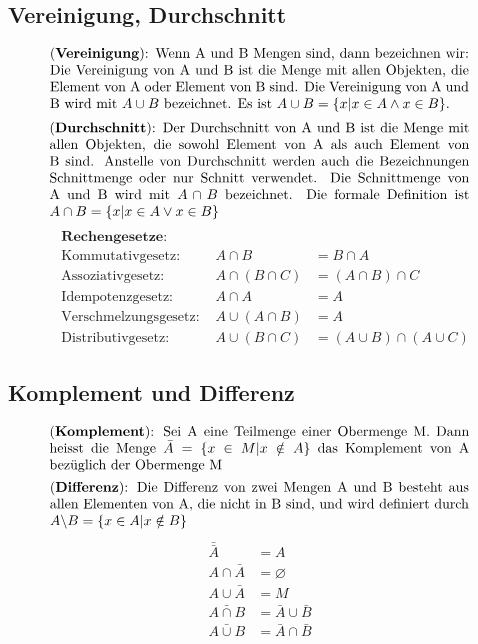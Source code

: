 \subsection{Vereinigung, Durchschnitt}
\begin{equation}
    \parbox{30em}{(\textbf{Vereinigung}): Wenn A und B Mengen sind, dann bezeichnen wir: 
    Die Vereinigung von A und B ist die Menge mit allen Objekten, die Element von 
    A oder Element von B sind. Die Vereinigung von A und B wird mit \(A \cup B\) bezeichnet. Es ist \(A \cup B = \{x|x \in A \land x \in B\}\).}
\end{equation}
\begin{equation}
    \parbox{30em}{(\textbf{Durchschnitt}): Der Durchschnitt von A und B ist die Menge mit allen Objekten, die sowohl 
    Element von A als auch Element von B sind. Anstelle von Durchschnitt werden
    auch die Bezeichnungen Schnittmenge oder nur Schnitt verwendet. Die Schnittmenge von A und B wird mit \(A \cap B\) bezeichnet. Die formale Definition ist \(A \cap B = \{x|x \in A \lor x \in B\}\)}
\end{equation}
\begin{equation}
    \begin{aligned}
        &\textbf{Rechengesetze}: \\
        &\text{Kommutativgesetz: } &A \cap B &= B \cap A \\
        &\text{Assoziativgesetz: } &A \cap (B \cap C) &= (A \cap B) \cap C \\
        &\text{Idempotenzgesetz: } &A \cap A &= A \\
        &\text{Verschmelzungsgesetz: } &A \cup (A \cap B) &= A \\
        &\text{Distributivgesetz: } &A \cup (B \cap C) &= (A \cup B) \cap (A \cup C)
    \end{aligned}
\end{equation}
\subsection{Komplement und Differenz}
\begin{equation}
    \parbox{30em}{(\textbf{Komplement}): Sei A eine Teilmenge einer Obermenge M. Dann heisst die Menge 
    \(\bar{A}=\{x \in M | x \notin A\}\) das Komplement von A bezüglich der Obermenge M}
\end{equation}
\begin{equation}
    \parbox{30em}{(\textbf{Differenz}): Die Differenz von zwei Mengen A und B besteht aus allen Elementen 
    von A, die nicht in B sind, und wird definiert durch \(A \backslash B = \{x \in A | x \notin B\}\)}
\end{equation}
\begin{equation}
    \begin{aligned}
        \bar{\bar{A}} &= A \\
        A \cap \bar{A} &= \varnothing \\
        A \cup \bar{A} &= M \\
        \bar{A \cap B} &= \bar{A} \cup \bar{B} \\
        \bar{A \cup B} &= \bar{A} \cap \bar{B}
    \end{aligned}
\end{equation}
